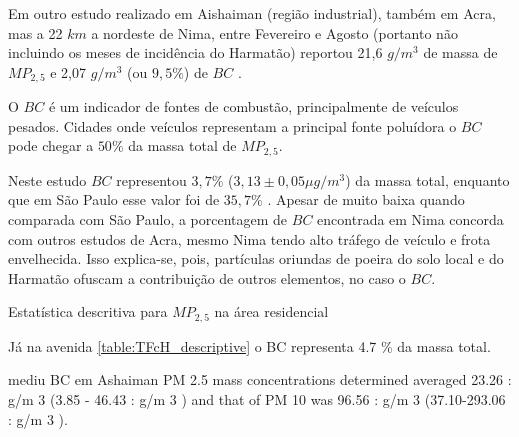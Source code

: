 Em outro estudo realizado em Aishaiman (região industrial), também em Acra, 
mas a 22 $km$ a nordeste de Nima, entre Fevereiro e Agosto (portanto não 
incluindo os meses de incidência do Harmatão) reportou 21,6 $g / m^3$ de massa 
de $MP_{2,5}$ e 2,07 $g / m^3$ (ou $9,5\%$) de $BC$ \citep{ofosu2012}.

O $BC$ é um indicador de fontes de combustão, principalmente de veículos pesados.
Cidades onde veículos representam a principal fonte poluídora o $BC$ pode chegar 
a $50\%$ da massa total de $MP_{2,5}$.  

Neste estudo $BC$ representou $3,7 \%$ ($3,13\pm 0,05 \mu g / m^3$) da massa 
total, enquanto que em São Paulo esse valor foi de $35,7 \%$ \citep{andrade2012}.
Apesar de muito baixa quando comparada com São Paulo, a porcentagem de $BC$ 
encontrada em Nima concorda com outros estudos de Acra, mesmo Nima tendo alto
tráfego de veículo e frota envelhecida. Isso explica-se, pois, partículas 
oriundas de poeira do solo local e do Harmatão ofuscam a contribuição de outros
elementos, no caso o $BC$. 

\begin{table}[H]
  \centering
    

  \caption{Estatística descritiva para $MP_{2,5}$ na área residencial
            \label{table:RFcH_descriptive}}
\end{table}



Já na avenida \ref{table:TFcH_descriptive} o BC
representa 4.7 \% da massa total.

%    


\citet{dotse2012} mediu BC em Ashaiman
PM 2.5 mass concentrations determined averaged 23.26 : g/m 3 (3.85 - 46.43 : g/m 3 ) and that of PM 10 was 96.56
: g/m 3 (37.10-293.06 : g/m 3 ).

